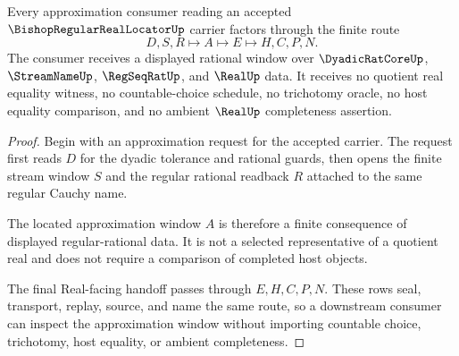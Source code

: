 \begin{theorem}
\label{thm:bishop-regular-real-locator-approximation-handoff}
Every approximation consumer reading an accepted $\BishopRegularRealLocatorUp$ carrier factors through the finite route
$$
D,S,R \longmapsto A \longmapsto E \longmapsto H,C,P,N .
$$
The consumer receives a displayed rational window over $\DyadicRatCoreUp$, $\StreamNameUp$, $\RegSeqRatUp$, and $\RealUp$ data. It receives no quotient real equality witness, no countable-choice schedule, no trichotomy oracle, no host equality comparison, and no ambient $\RealUp$ completeness assertion.
\end{theorem}
\begin{proof}
Begin with an approximation request for the accepted carrier. The request first reads $D$ for the dyadic tolerance and rational guards, then opens the finite stream window $S$ and the regular rational readback $R$ attached to the same regular Cauchy name.

The located approximation window $A$ is therefore a finite consequence of displayed regular-rational data. It is not a selected representative of a quotient real and does not require a comparison of completed host objects.

The final Real-facing handoff passes through $E,H,C,P,N$. These rows seal, transport, replay, source, and name the same route, so a downstream consumer can inspect the approximation window without importing countable choice, trichotomy, host equality, or ambient completeness.
\end{proof}

